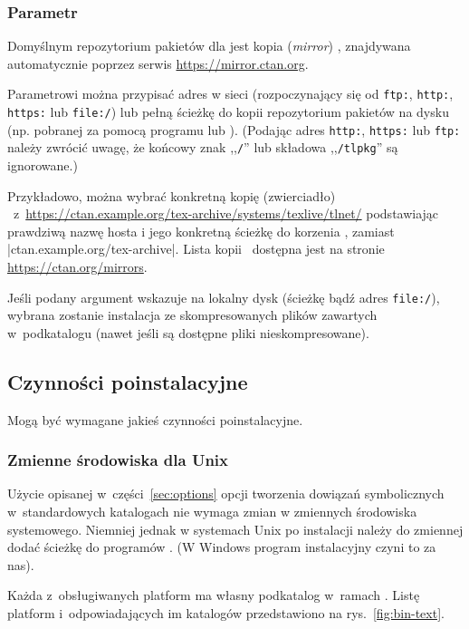 \documentclass{article}
\begin{document}
\subsubsection{Parametr }
\label{sec:location}

Domyślnym repozytorium pakietów dla \TL{} jest kopia (\textit{mirror}) \CTAN,
znajdywana automatycznie poprzez serwis \url{https://mirror.ctan.org}.

Parametrowi  można przypisać adres w sieci
(rozpoczynający się  od \texttt{ftp:}, \texttt{http:}, \texttt{https:} lub \texttt{file:/})
lub pełną ścieżkę do kopii repozytorium pakietów na dysku (np. pobranej za pomocą
programu  lub ). (Podając adres \texttt{http:}, \texttt{https:}
lub \texttt{ftp:} należy zwrócić uwagę, że końcowy znak ,,\texttt{/}'' lub składowa
,,\texttt{/tlpkg}'' są ignorowane.)

Przykładowo, można wybrać konkretną kopię (zwierciadło) \CTAN\
z~\url{https://ctan.example.org/tex-archive/systems/texlive/tlnet/} podstawiając
prawdziwą nazwę hosta i jego konkretną ścieżkę do korzenia \CTAN, zamiast
|ctan.example.org/tex-archive|. Lista kopii \CTAN\ dostępna jest na
stronie \url{https://ctan.org/mirrors}.

Jeśli podany argument wskazuje na lokalny dysk (ścieżkę bądź adres \texttt{file:/}), wybrana
zostanie instalacja ze skompresowanych plików  zawartych %
w~podkatalogu \dirname{archive} (nawet jeśli są dostępne pliki nieskompresowane).

\subsection{Czynności poinstalacyjne}
\label{sec:postinstall}

Mogą być wymagane jakieś czynności poinstalacyjne.

\subsubsection{Zmienne środowiska dla Unix}
\label{sec:env}

Użycie opisanej w~części~\ref{sec:options} opcji tworzenia dowiązań
symbolicznych w~standardowych katalogach nie wymaga zmian w zmiennych
środowiska systemowego. Niemniej jednak w systemach Unix
po instalacji należy do zmiennej  dodać ścieżkę do
programów \TL. (W Windows program instalacyjny czyni to za nas).

Każda z~obsługiwanych platform ma własny podkatalog
w~ramach . Listę platform i~odpowiadających im katalogów
przedstawiono na rys.~\ref{fig:bin-text}.
\end{document}
